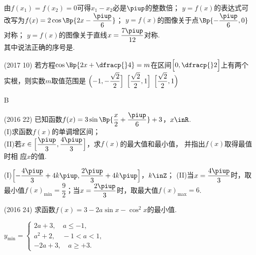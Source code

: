 \begin{exercise}
        由$f(x_1)=f(x_2)=0$可得$x_1-x_2$必是$\piup$的整数倍；
        $y=f(x)$的表达式可改写为$f(x)=2\cos\Bp{2x-\dfrac{\piup}6}$；
        $y=f(x)$的图像关于点$\Bp{-\dfrac{\piup}6,0}$对称；
        $y=f(x)$的图像关于直线$x=\dfrac{7\piup}{12}$对称.\\
        其中说法正确的序号是\tk.
        \begin{answer}
        \end{answer}
      \item%
        (2017  10)
        若方程$\cos\Bp{2x+\dfracp{}4}=m$在区间$\Bigl[0,\dfracp{}2\Bigr]$上有两个实根，则实数$m$取值范围是\xz
         {$\Bigl(-1,-\dfrac{\sqrt2}2\Bigr]$}
         {$\Bigl[\dfrac{\sqrt2}2,1\Bigr]$}
         {$\Bigl[\dfrac{\sqrt2}2,1\Bigr)$}
        \begin{answer}
          B
        \end{answer}
      \item%
        (2016  22)
        已知函数$f(x)=3\sin\Bp{\dfrac{x}2+\dfrac{\piup}6}+3$，$x\inR$.\\
        (I)求函数$f(x)$的单调增区间；\\
        (II)若$x\in\Bigl[\dfrac{\piup}3,\dfrac{4\piup}3\Bigr]$，求$f(x)$的最大值和最小值，
        并指出$f(x)$取得最值时相
        应$x$的值.
        \begin{answer}
          (I)$\Bigl[-\dfrac{4\piup}3+4k\piup,\dfrac{2\piup}3+4k\piup\Bigr]$，$k\inZ$；
          (II)当$x=\dfrac{4\piup}3$时，取最小值$f(x)_{\min}=\dfrac92$；当$x=\dfrac{2\piup}3$时，取最大值$f(x)_{\max}=6$.
        \end{answer}
      \vspace{8cm}
      \item%
        (2016  24)
        求函数$f(x)=3-2a\sin x-\cos^2x$的最小值.
        \begin{answer}
          $y_{\min}=\begin{cases}
            2a+3,\quad a\leqslant-1,\\
            a^2+2,\quad -1<a<1,\\
            -2a+3,\quad a\geqslant+3.
          \end{cases}$
        \end{answer}
      \vspace{7cm}
    \end{exercise}
